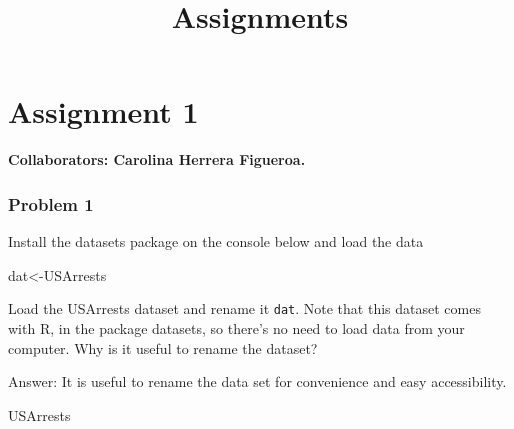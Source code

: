\documentclass[
]{article}
\title{Assignments}
\author{}
\date{\vspace{-2.5em}}
\newenvironment{Shaded}{\begin{snugshade}}{\end{snugshade}}
\newcommand{\NormalTok}[1]{#1}
\begin{document}
\maketitle

{
\setcounter{tocdepth}{1}
\tableofcontents
}
\hypertarget{assignment-1}{%
\section{Assignment 1}\label{assignment-1}}

\textbf{Collaborators: Carolina Herrera Figueroa. }

\hypertarget{problem-1}{%
\subsubsection{Problem 1}\label{problem-1}}

Install the datasets package on the console below and load the data

\begin{Shaded}
\begin{Highlighting}[]
\NormalTok{dat<-USArrests}
\end{Highlighting}
\end{Shaded}

Load the USArrests dataset and rename it \texttt{dat}. Note that this
dataset comes with R, in the package datasets, so there's no need to
load data from your computer. Why is it useful to rename the dataset?

Answer: It is useful to rename the data set for convenience and easy
accessibility.

\begin{Shaded}
\begin{Highlighting}[]
\NormalTok{USArrests}
\end{Highlighting}
\end{Shaded}
\end{document}
